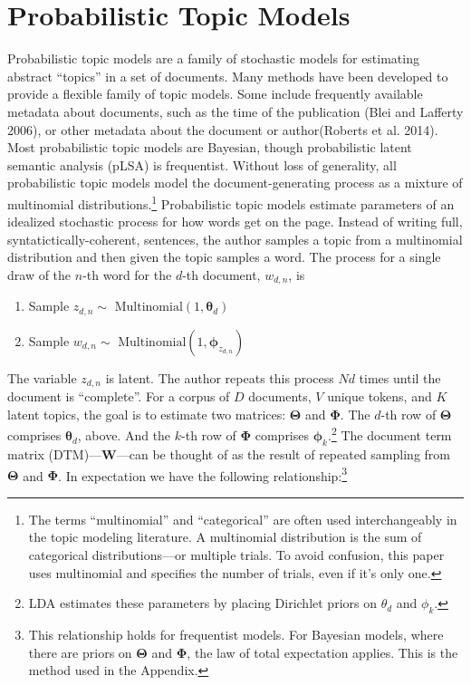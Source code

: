 \documentclass[conference,final,]{IEEEtran}
\providecommand{\tightlist}{%
  \setlength{\itemsep}{0pt}\setlength{\parskip}{0pt}}
\begin{document}
\hypertarget{probabilistic-topic-models}{%
\section{Probabilistic Topic Models}\label{probabilistic-topic-models}}

Probabilistic topic models are a family of stochastic models for
estimating abstract ``topics'' in a set of documents. Many methods have
been developed to provide a flexible family of topic models. Some
include frequently available metadata about documents, such as the time
of the publication (Blei and Lafferty 2006), or other metadata about the
document or author(Roberts et al. 2014). Most probabilistic topic models
are Bayesian, though probabilistic latent semantic analysis (pLSA) is
frequentist. Without loss of generality, all probabilistic topic models
model the document-generating process as a mixture of multinomial
distributions.\footnote{The terms ``multinomial'' and ``categorical''
  are often used interchangeably in the topic modeling literature. A
  multinomial distribution is the sum of categorical distributions---or
  multiple trials. To avoid confusion, this paper uses multinomial and
  specifies the number of trials, even if it's only one.} Probabilistic
topic models estimate parameters of an idealized stochastic process for
how words get on the page. Instead of writing full,
syntatictically-coherent, sentences, the author samples a topic from a
multinomial distribution and then given the topic samples a word. The
process for a single draw of the \(n\)-th word for the \(d\)-th
document, \(w_{d,n}\), is

\begin{enumerate}
\def\labelenumi{\arabic{enumi}.}
\tightlist
\item
  Sample \(z_{d,n}\sim\) \(\text{Multinomial}(1,\boldsymbol\theta_d)\)
\item
  Sample \(w_{d,n}\sim\)
  \(\text{Multinomial}(1,\boldsymbol\phi_{z_{d,n}})\)
\end{enumerate}

The variable \(z_{d,n}\) is latent. The author repeats this process
\(Nd\) times until the document is ``complete''. For a corpus of \(D\)
documents, \(V\) unique tokens, and \(K\) latent topics, the goal is to
estimate two matrices: \(\boldsymbol\Theta\) and \(\boldsymbol\Phi\).
The \(d\)-th row of \(\boldsymbol\Theta\) comprises
\(\boldsymbol\theta_d\), above. And the \(k\)-th row of
\(\boldsymbol\Phi\) comprises \(\boldsymbol\phi_k\).\footnote{LDA
  estimates these parameters by placing Dirichlet priors on \(\theta_d\)
  and \(\phi_k\).} The document term matrix (DTM)---\(\mathbf{W}\)---can
be thought of as the result of repeated sampling from
\(\boldsymbol\Theta\) and \(\boldsymbol\Phi\). In expectation we have
the following relationship:\footnote{This relationship holds for
  frequentist models. For Bayesian models, where there are priors on
  \(\boldsymbol\Theta\) and \(\boldsymbol\Phi\), the law of total
  expectation applies. This is the method used in the Appendix.}
\end{document}
